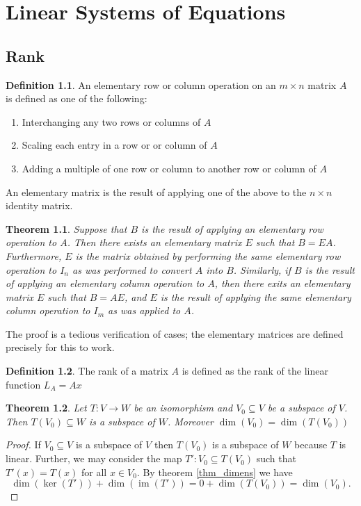 \documentclass[oneside, 12pt]{book}
\DeclareMathOperator{\im}{im}
\newtheorem{thm}{Theorem}[section]
\theoremstyle{definition}
\newtheorem{defn}{Definition}[section]
\begin{document}
\chapter{Linear Systems of Equations}
\section{Rank}
\begin{defn}
\label{defn_elmop}
  An elementary row or column operation on an $m \times n$ matrix $A$ is defined as one of the following:
  \begin{enumerate}
    \item Interchanging any two rows or columns of $A$
    \item Scaling each entry in a row or or column of $A$
    \item Adding a multiple of one row or column to another row or column of $A$
  \end{enumerate}
  An elementary matrix is the result of applying one of the above to the $n \times n$ identity matrix.
\end{defn}
\begin{thm}
\label{thm_elmop}
  Suppose that $B$ is the result of applying an elementary row operation to $A$. Then there exists an elementary matrix $E$ such that $B=EA$. Furthermore, $E$ is the matrix obtained by performing the same elementary row operation to $I_{n}$ as was performed to convert $A$ into $B$. Similarly, if $B$ is the result of applying
  an elementary column operation to $A$, then there exits an elementary matrix $E$ such that $B=AE$, and $E$ is the result of applying the same elementary column operation to $I_{m}$ as was applied to $A$.
\end{thm}
The proof is a tedious verification of cases; the elementary matrices are defined precisely for this to work.
\begin{defn}
\label{defn_rnk}
The rank of a matrix $A$ is defined as the rank of the linear function $L_{A}=Ax$
\end{defn}
\begin{thm}
  \label{thm_subiso}
Let $T: V \to W$ be an isomorphism and $V_{0} \subseteq V$ be a subspace of $V$. Then $T(V_{0})\subseteq W$ is a subspace of $W$. Moreover $\dim(V_{0})=\dim(T(V_{0}))$
\end{thm}
\begin{proof}
  If $V_{0}\subseteq V$ is a subspace of $V$ then $T(V_{0})$ is a subspace of $W$ because $T$ is linear. Further, we may consider the map $T':V_{0} \subseteq T(V_{0})$ such that $T'(x)=T(x)$ for all $x \in V_{0}$. By theorem \ref{thm_dimens} we have \[\dim(\ker(T'))+\dim(\im(T'))=0+ \dim(T(V_{0}))=\dim(V_{0}).\]
\end{proof}
\end{document}

